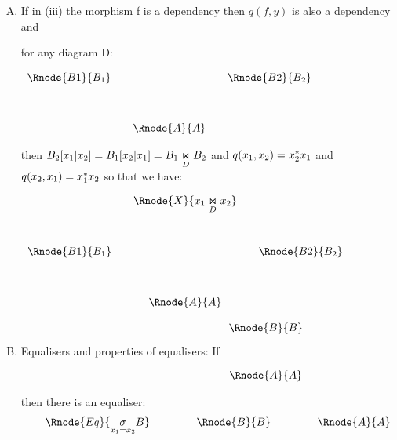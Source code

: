 \documentclass[10pt,a4paper]{scrartcl}
\begin{document}
\begin{enumerate} [A.,leftmargin=0.5cm]
\noindent


\item If in (iii) the morphism f is a dependency then  $q(f,y)$ is also a dependency and 

\noindent for any diagram D:
\begin{center}
$
\begin{array}{cp{0cm}cp{0cm}c}
\Rnode{B1}{B_1}& &            &  &\Rnode{B2}{B_2} \\ [1.2cm]
               & &\Rnode{A}{A}& &
\end{array}
$
\end{center}

\noindent then
$B_2[x_1|x_2]=B_1[x_2|x_1] = \fibrex{B_1}{B_2}{D}$ and $q(x_1,x_2)= x_2\sub x_1 $ and $q(x_2,x_1)= x_1 \sub x_2$
\noindent
so that we have:

\begin{center}
$
\begin{array}{cp{0cm}cp{0cm}c}
               && \Rnode{X}{\fibrex{x_1}{x_2}{D}}&&                \\ [1.2cm]
\Rnode{B1}{B_1}&&                                && \Rnode{B2}{B_2} \\ [1.2cm]
               &&\Rnode{A}{A}                    && 
\end{array}
$
\end{center}



\item Equalisers and properties of equalisers: If
\setlength{\arraycolsep}{1cm}
$
\begin{array}{c}
\Rnode{B}{B} \\ [1.1cm]
\Rnode{A}{A} \\
\end{array}
$

then there is an equaliser: \\


$$
\setlength{\arraycolsep}{.75cm}
\begin{array}{ccc}
\Rnode{Eq}{\underset{x_1=x_2}{\sigma}B} & \Rnode{B}{B}  & \Rnode{A}{A} \\
\end{array}
$$


\end{enumerate}
\end{document}
